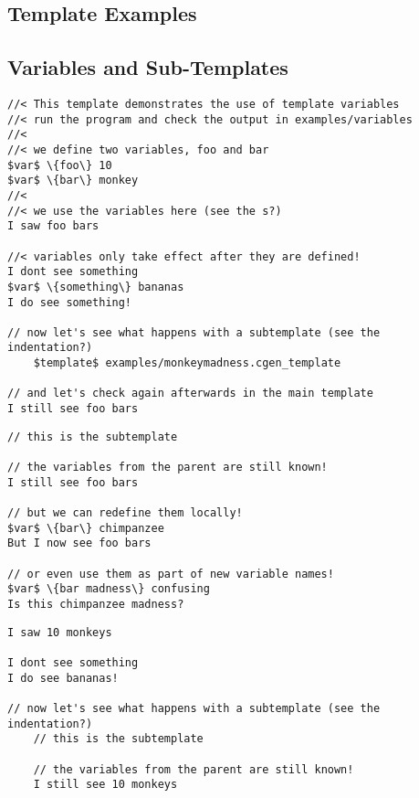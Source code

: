 \documentclass{settings/TU_Delft_Report}
\begin{document}
\begin{appendices}
\chapter{Template Examples}
\section{Variables and Sub-Templates} \label{ex1}
\begin{lstlisting}[caption={base template : variables},label={ex1:variables},language={}]
//< This template demonstrates the use of template variables
//< run the program and check the output in examples/variables
//<
//< we define two variables, foo and bar
$var$ \{foo\} 10
$var$ \{bar\} monkey
//<
//< we use the variables here (see the s?)
I saw foo bars

//< variables only take effect after they are defined!
I dont see something
$var$ \{something\} bananas
I do see something!

// now let's see what happens with a subtemplate (see the indentation?)
	$template$ examples/monkeymadness.cgen_template

// and let's check again afterwards in the main template
I still see foo bars
\end{lstlisting}

\begin{lstlisting}[caption={sub-template : monkeymadness},label={ex1:mmadness},language={}]
// this is the subtemplate

// the variables from the parent are still known!
I still see foo bars

// but we can redefine them locally!
$var$ \{bar\} chimpanzee
But I now see foo bars

// or even use them as part of new variable names!
$var$ \{bar madness\} confusing
Is this chimpanzee madness?
\end{lstlisting}

\newpage
\begin{lstlisting}[caption={result},label={ex1:result},language={}]
I saw 10 monkeys

I dont see something
I do see bananas!

// now let's see what happens with a subtemplate (see the indentation?)
	// this is the subtemplate
	
	// the variables from the parent are still known!
	I still see 10 monkeys
	

\end{lstlisting}
\end{appendices}
\end{document}
